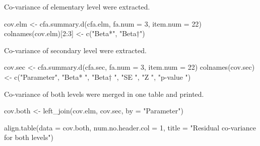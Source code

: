 \documentclass[
]{article}
\newenvironment{Shaded}{\begin{snugshade}}{\end{snugshade}}
\newcommand{\AttributeTok}[1]{\textcolor[rgb]{0.77,0.63,0.00}{#1}}
\newcommand{\DecValTok}[1]{\textcolor[rgb]{0.00,0.00,0.81}{#1}}
\newcommand{\FunctionTok}[1]{\textcolor[rgb]{0.00,0.00,0.00}{#1}}
\newcommand{\NormalTok}[1]{#1}
\newcommand{\OtherTok}[1]{\textcolor[rgb]{0.56,0.35,0.01}{#1}}
\newcommand{\SpecialCharTok}[1]{\textcolor[rgb]{0.00,0.00,0.00}{#1}}
\newcommand{\StringTok}[1]{\textcolor[rgb]{0.31,0.60,0.02}{#1}}
\begin{document}
Co-variance of elementary level were extracted.

\begin{Shaded}
\begin{Highlighting}[]
\NormalTok{cov.elm }\OtherTok{\textless{}{-}} \FunctionTok{cfa.summary.d}\NormalTok{(cfa.elm, }\AttributeTok{fa.num =} \DecValTok{3}\NormalTok{, }\AttributeTok{item.num =} \DecValTok{22}\NormalTok{)}
\FunctionTok{colnames}\NormalTok{(cov.elm)[}\DecValTok{2}\SpecialCharTok{:}\DecValTok{3}\NormalTok{] }\OtherTok{\textless{}{-}} \FunctionTok{c}\NormalTok{(}\StringTok{"Beta*"}\NormalTok{, }\StringTok{"Beta†"}\NormalTok{)}
\end{Highlighting}
\end{Shaded}

Co-variance of secondary level were extracted.

\begin{Shaded}
\begin{Highlighting}[]
\NormalTok{cov.sec }\OtherTok{\textless{}{-}} \FunctionTok{cfa.summary.d}\NormalTok{(cfa.sec, }\AttributeTok{fa.num =} \DecValTok{3}\NormalTok{, }\AttributeTok{item.num =} \DecValTok{22}\NormalTok{)}
\FunctionTok{colnames}\NormalTok{(cov.sec) }\OtherTok{\textless{}{-}} \FunctionTok{c}\NormalTok{(}\StringTok{"Parameter"}\NormalTok{, }\StringTok{"Beta* "}\NormalTok{, }\StringTok{"Beta† "}\NormalTok{, }\StringTok{"SE "}\NormalTok{, }\StringTok{"Z "}\NormalTok{, }\StringTok{"p{-}value "}\NormalTok{)}
\end{Highlighting}
\end{Shaded}

Co-variance of both levels were merged in one table and printed.

\begin{Shaded}
\begin{Highlighting}[]
\NormalTok{cov.both }\OtherTok{\textless{}{-}} \FunctionTok{left\_join}\NormalTok{(cov.elm, }
\NormalTok{                     cov.sec, }
                     \AttributeTok{by =} \StringTok{"Parameter"}\NormalTok{)}

\FunctionTok{align.table}\NormalTok{(}\AttributeTok{data =}\NormalTok{ cov.both, }
            \AttributeTok{num.no.header.col =} \DecValTok{1}\NormalTok{, }
            \AttributeTok{title =} \StringTok{"Residual co{-}variance for both levels"}\NormalTok{)}
\end{Highlighting}
\end{Shaded}
\end{document}

